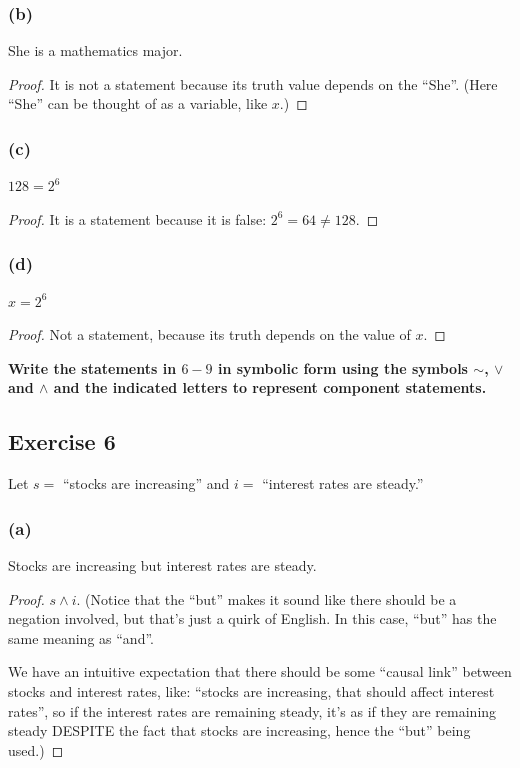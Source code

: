 \documentclass[14pt]{extarticle}
\begin{document}
\subsubsection{(b)} She is a mathematics major.
\begin{proof} It is not a statement because its truth value depends on the
``She''. (Here ``She'' can be thought of as a variable, like $x$.) \end{proof}

\subsubsection{(c)} $128 = 2^6$
\begin{proof} It is a statement because it is false: $2^6 = 64 \neq 128$.
\end{proof}

\subsubsection{(d)} $x = 2^6$
\begin{proof} Not a statement, because its truth depends on the value of $x$.
\end{proof}

{\bf Write the statements in $6-9$ in symbolic form using the symbols $\sim$,
$\vee$ and $\wedge$ and the indicated letters to represent component
statements.}

\subsection{Exercise 6} Let $s =$ “stocks are increasing” and $i =$ “interest
rates are steady.”

\subsubsection{(a)} Stocks are increasing but interest rates are steady.
\begin{proof} $s \wedge i$.
(Notice that the ``but'' makes it sound like there should be a negation
involved, but that's just a quirk of English. In this case, ``but'' has the same
meaning as ``and''.

We have an intuitive expectation that there should be some ``causal link''
between stocks and interest rates, like: ``stocks are increasing, that should
affect interest rates'', so if the interest rates are remaining steady, it's as
if they are remaining steady DESPITE the fact that stocks are increasing, hence
the ``but'' being used.) \end{proof}
\end{document}
